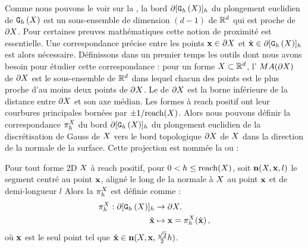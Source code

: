 Comme nous pouvons le voir sur la , la bord
$\partial\lbrack \mathtt{G}_{h}\left(X\right) \rbrack_{h}$ du plongement euclidien de $\mathtt{G}_{h}\left(X\right)$ est un sous-ensemble
de dimension $(d-1)$ de $\mathbb{R}^d$ qui est proche de $\partial X$. Pour
certaines preuves mathématiques cette notion de proximité est essentielle. Une
correspondance précise entre les points $\mathbf{x} \in \partial X$ et $\hat{\mathbf{x}}\in
\partial\lbrack \mathtt{G}_{h}\left(X\right) \rbrack_{h}$ est alors nécessaire. Définissons dans un premier temps
les outils dont nous avons besoin pour étudier cette correspondance : pour un
forme $X \subset \mathbb{R}^d$, l' $MA(\partial X)$ de $\partial X$ est le
sous-ensemble de $\mathbb{R}^d$ dans lequel chacun des points est le plus proche d'au
moins deux points de $\partial X$. Le  de $\partial X$ est la borne
inférieure de la distance entre $\partial X$ et son axe médian. Les formes à reach
positif ont leur courbures principales bornées par $\pm 1 / \mathrm{reach}(X)$.
%
%
Alors nous pouvons définir la correspondance $\pi_h^{X}$ du bord
$\partial\lbrack \mathtt{G}_{h}\left(X\right) \rbrack_{h}$ du plongement euclidien de la discrétisation de Gauss
de $X$ vers le bord topologique $\partial X$ de $X$ dans la direction de la
normale de la surface. Cette projection est nommée la  ou  \cite{Lachaud2006HDR} :
%
\begin{definition}{}
\label{def:projection}
%
  Pour tout forme 2D $X$ à reach positif, pour $0 < h \le \mathrm{reach}(X)$,
  soit $\mathbf{n}(X,\mathbf{x},l)$ le segment centré au point $\mathbf{x}$, aligné le
  long de la normale à $X$ au point $\mathbf{x}$ et de demi-longueur $l$ Alors la
   $\pi_h^{X}$ est définie comme :
  \begin{align}
    \pi_h^{X}: \partial\lbrack \mathtt{G}_{h}\left(X\right) \rbrack_{h} &\rightarrow \partial X, \nonumber \\
    \hat{\mathbf{x}} &\mapsto \mathbf{x}=\pi_h^{X}(\hat{\mathbf{x}}) \,,
  \end{align}
  où $\mathbf{x}$ est le seul point tel que $\hat{\mathbf{x}} \in
  \mathbf{n}(X,\mathbf{x},\frac{\sqrt{2}}{2}h)$.
%
\end{definition}
%
